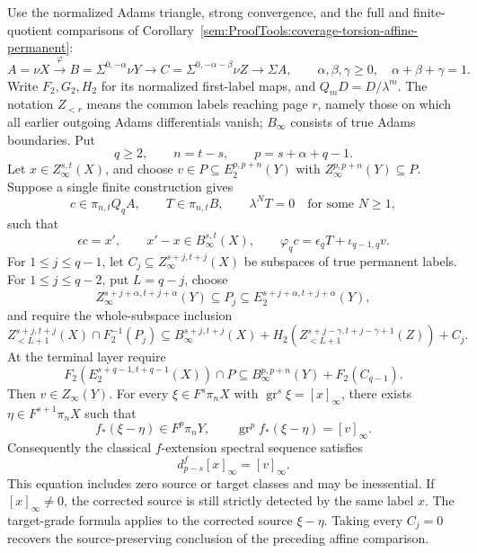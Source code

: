 \begin{proposition}
\label{sem:ProofTools:coverage-ess-source-adjustment}
Use the normalized Adams triangle, strong convergence, and the full
and finite-quotient comparisons of
Corollary~\ref{sem:ProofTools:coverage-torsion-affine-permanent}:
\[
 A=\nu X\xrightarrow{\varphi}
 B=\Sigma^{0,-\alpha}\nu Y\longrightarrow
 C=\Sigma^{0,-\alpha-\beta}\nu Z\longrightarrow\Sigma A,
 \qquad \alpha,\beta,\gamma\geq0,\quad \alpha+\beta+\gamma=1.
\]
Write $F_2,G_2,H_2$ for its normalized first-label maps, and
$Q_mD=D/\lambda^m$. The notation $Z_{<r}$ means the common labels
reaching page $r$, namely those on which all earlier outgoing Adams
differentials vanish; $B_\infty$ consists of true Adams
boundaries. Put
\[
 q\geq2,\qquad n=t-s,\qquad p=s+\alpha+q-1.
\]
Let $x\in Z_\infty^{s,t}(X)$, and choose
$v\in P\subseteq E_2^{p,p+n}(Y)$ with
$Z_\infty^{p,p+n}(Y)\subseteq P$. Suppose a single finite construction gives
\[
 c\in\pi_{n,t}Q_qA,\qquad T\in\pi_{n,t}B,\qquad \lambda^NT=0
 \quad\text{for some }N\geq1,
\]
such that
\[
 \epsilon c=x',\qquad x'-x\in B_\infty^{s,t}(X),\qquad
 \varphi_qc=\epsilon_qT+\iota_{q-1,q}v.
\]
For $1\leq j\leq q-1$, let
$C_j\subseteq Z_\infty^{s+j,t+j}(X)$ be subspaces of true permanent labels.
For $1\leq j\leq q-2$, put $L=q-j$, choose
\[
 Z_\infty^{s+j+\alpha,t+j+\alpha}(Y)
 \subseteq P_j\subseteq E_2^{s+j+\alpha,t+j+\alpha}(Y),
\]
and require the whole-subspace inclusion
\[
 Z_{<L+1}^{s+j,t+j}(X)\cap F_2^{-1}(P_j)
 \subseteq B_\infty^{s+j,t+j}(X)
 +H_2\!\left(Z_{<L+1}^{s+j-\gamma,t+j-\gamma+1}(Z)\right)+C_j.
\]
At the terminal layer require
\[
 F_2\!\left(E_2^{s+q-1,t+q-1}(X)\right)\cap P
 \subseteq B_\infty^{p,p+n}(Y)+F_2(C_{q-1}).
\]
Then $v\in Z_\infty(Y)$. For every
$\xi\in F^s\pi_nX$ with $\operatorname{gr}^s\xi=[x]_\infty$, there exists
$\eta\in F^{s+1}\pi_nX$ such that
\[
 f_*(\xi-\eta)\in F^p\pi_nY,\qquad
 \operatorname{gr}^p f_*(\xi-\eta)=[v]_\infty.
\]
Consequently the classical $f$-extension spectral sequence satisfies
\[
 d^f_{p-s}[x]_\infty=[v]_\infty.
\]
This equation includes zero source or target classes and may be inessential.
If $[x]_\infty\neq0$, the corrected source is still strictly detected by
the same label $x$. The target-grade formula applies to the corrected source $\xi-\eta$. Taking every $C_j=0$ recovers the
source-preserving conclusion of the preceding affine comparison.
\end{proposition}
